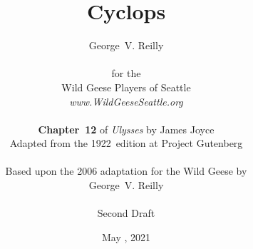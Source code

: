 


\title{\Huge Cyclops}
\author{George~V. Reilly\\
\\
{\small for the}\\
Wild Geese Players of Seattle\\
{\textit{www.WildGeeseSeattle.org}}\\
\\
{\small \textbf{Chapter~12} of \textit{Ulysses} by James Joyce}\\
{\small Adapted from the 1922~edition at Project Gutenberg}
\\
\\
{\small Based upon the 2006 adaptation for the Wild Geese by}\\
{\small George~V. Reilly}\\
\\
{\small Second Draft}}
\date{May , 2021}
\raggedbottom



\maketitle
\thispagestyle{empty}
\pagebreak

